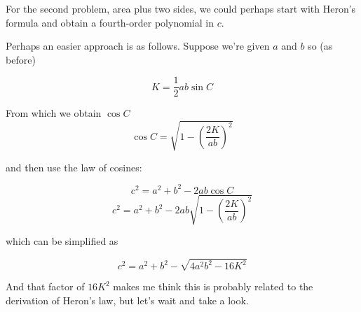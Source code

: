 \documentclass[11pt, oneside]{article}
\begin{document}
For the second problem, area plus two sides, we could perhaps start with Heron's formula and obtain a fourth-order polynomial in $c$.

Perhaps an easier approach is as follows.  Suppose we're given $a$ and $b$ so (as before)

\[ K = \frac{1}{2} ab \sin C \]

From which we obtain $\cos C$
\[ \cos C = \sqrt{1 - (\frac{2K}{ab})^2 } \]

and then use the law of cosines:

\[ c^2 = a^2 + b^2 - 2ab \cos C \]
\[ c^2 = a^2 + b^2 - 2ab \sqrt{1 - (\frac{2K}{ab})^2} \]

which can be simplified as

\[ c^2 = a^2 + b^2 -  \sqrt{4a^2b^2 - 16K^2} \]

And that factor of $16K^2$ makes me think this is probably related to the derivation of Heron's law, but let's wait and take a look.
\end{document}
